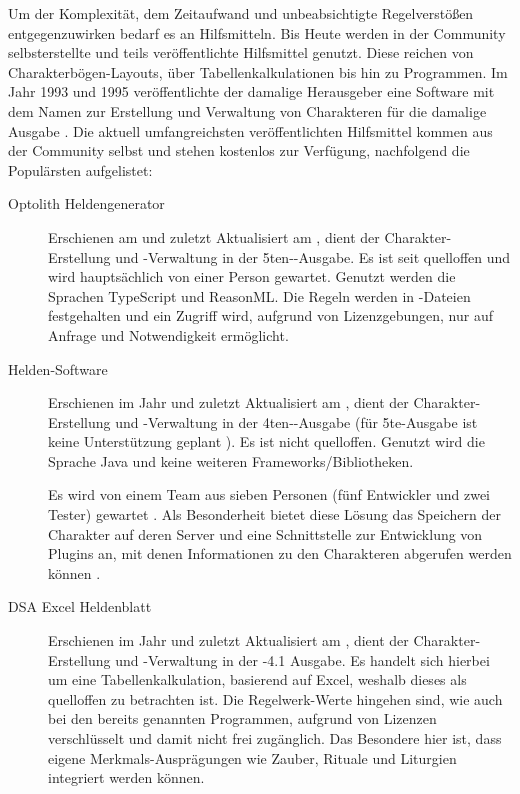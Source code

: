 Um der Komplexität, dem Zeitaufwand und unbeabsichtigte Regelverstößen entgegenzuwirken bedarf es an Hilfsmitteln.
Bis Heute werden in der Community selbsterstellte und teils veröffentlichte Hilfsmittel genutzt.
Diese reichen von Charakterbögen-Layouts, über Tabellenkalkulationen bis hin zu Programmen. %
Im Jahr 1993 und 1995 veröffentlichte der damalige Herausgeber eine Software mit dem Namen  zur Erstellung und Verwaltung von Charakteren für die damalige Ausgabe .
Die aktuell umfangreichsten veröffentlichten Hilfsmittel kommen aus der Community selbst und stehen kostenlos zur Verfügung, nachfolgend die Populärsten aufgelistet:
\begin{description}
    \item[Optolith Heldengenerator] Erschienen am  und zuletzt Aktualisiert am , dient der Charakter-Erstellung und -Verwaltung in der 5ten--Ausgabe.
    Es ist seit  quelloffen und wird hauptsächlich von einer Person gewartet.
    Genutzt werden die Sprachen TypeScript und ReasonML.
    Die Regeln werden in -Dateien festgehalten und ein Zugriff wird, aufgrund von Lizenzgebungen, nur auf Anfrage und Notwendigkeit ermöglicht.

    \item[Helden-Software] Erschienen im Jahr  und zuletzt Aktualisiert am , dient der Charakter-Erstellung und -Verwaltung in der 4ten--Ausgabe (für 5te-Ausgabe ist keine Unterstützung geplant ).
    Es ist nicht quelloffen.
    Genutzt wird die Sprache Java und keine weiteren Frameworks/Bibliotheken. 

    Es wird von einem Team aus sieben Personen (fünf Entwickler und zwei Tester) gewartet .
    Als Besonderheit bietet diese Lösung das Speichern der Charakter auf deren Server und eine Schnittstelle zur Entwicklung von Plugins an, mit denen Informationen zu den Charakteren abgerufen werden können .

    \item[DSA Excel Heldenblatt] Erschienen im Jahr  und zuletzt Aktualisiert am , dient der Charakter-Erstellung und -Verwaltung in der -4.1 Ausgabe.
    Es handelt sich hierbei um eine Tabellenkalkulation, basierend auf Excel, weshalb dieses als quelloffen zu betrachten ist.
    Die Regelwerk-Werte hingehen sind, wie auch bei den bereits genannten Programmen, aufgrund von Lizenzen verschlüsselt und damit nicht frei zugänglich.
    Das Besondere hier ist, dass eigene Merkmals-Ausprägungen wie \zB Zauber, Rituale und Liturgien integriert werden können.


\end{description}

